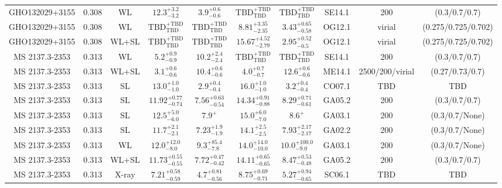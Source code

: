 \begin{table}
\begin{tabular}{cccccccccc}
GHO132029+3155 & 0.308 & WL & ${12.3}^{+3.2}_{-3.2}$ & ${3.9}^{+0.6}_{-0.6}$ & ${\mathrm{TBD}}^{+\mathrm{TBD}}_{\mathrm{TBD}}$ & ${\mathrm{TBD}}^{+\mathrm{TBD}}_{\mathrm{TBD}}$ & SE14.1 & 200 & (0.3/0.7/0.7) \\
GHO132029+3155 & 0.308 & WL & ${\mathrm{TBD}}^{+\mathrm{TBD}}_{\mathrm{TBD}}$ & ${\mathrm{TBD}}^{+\mathrm{TBD}}_{\mathrm{TBD}}$ & ${8.81}^{+3.35}_{-2.35}$ & ${3.43}^{+0.65}_{-0.58}$ & OG12.1 & virial & (0.275/0.725/0.702) \\
GHO132029+3155 & 0.308 & WL+SL & ${\mathrm{TBD}}^{+\mathrm{TBD}}_{\mathrm{TBD}}$ & ${\mathrm{TBD}}^{+\mathrm{TBD}}_{\mathrm{TBD}}$ & ${15.67}^{+4.52}_{-2.79}$ & ${2.95}^{+0.52}_{-0.5}$ & OG12.1 & virial & (0.275/0.725/0.702) \\
MS 2137.3-2353 & 0.313 & WL & ${5.2}^{+0.9}_{-0.9}$ & ${10.2}^{+2.4}_{-2.4}$ & ${\mathrm{TBD}}^{+\mathrm{TBD}}_{\mathrm{TBD}}$ & ${\mathrm{TBD}}^{+\mathrm{TBD}}_{\mathrm{TBD}}$ & SE14.1 & 200 & (0.3/0.7/0.7) \\
MS 2137.3-2353 & 0.313 & WL+SL & ${3.1}^{+0.6}_{-0.6}$ & ${10.4}^{+0.6}_{-0.6}$ & ${4.0}^{+0.7}_{-0.7}$ & ${12.6}^{+0.6}_{-0.6}$ & ME14.1 & 2500/200/virial & (0.27/0.73/0.7) \\
MS 2137.3-2353 & 0.313 & SL & ${13.0}^{+1.0}_{-1.0}$ & ${2.9}^{+0.4}_{-0.4}$ & ${16.0}^{+1.0}_{-1.0}$ & ${3.2}^{+0.4}_{-0.4}$ & CO07.1 & TBD & TBD \\
MS 2137.3-2353 & 0.313 & SL & ${11.92}^{+0.77}_{-0.74}$ & ${7.56}^{+0.63}_{-0.54}$ & ${14.34}^{+0.91}_{-0.88}$ & ${8.29}^{+0.71}_{-0.61}$ & GA05.2 & 200 & (0.3/0.7/0.7) \\
MS 2137.3-2353 & 0.313 & SL & ${12.5}^{+5.0}_{-6.0}$ & ${7.9}^{+}_{}$ & ${15.0}^{+6.0}_{-7.0}$ & ${8.6}^{+}_{}$ & GA03.1 & 200 & (0.3/0.7/None) \\
MS 2137.3-2353 & 0.313 & SL & ${11.7}^{+2.1}_{-2.1}$ & ${7.23}^{+1.9}_{-1.9}$ & ${14.1}^{+2.5}_{-2.5}$ & ${7.93}^{+2.17}_{-2.17}$ & GA02.2 & 200 & (0.3/0.7/None) \\
MS 2137.3-2353 & 0.313 & WL & ${12.0}^{+12.0}_{-8.0}$ & ${9.3}^{+85.4}_{-7.8}$ & ${14.0}^{+14.0}_{-10.0}$ & ${10.0}^{+100.0}_{-9.0}$ & GA03.1 & 200 & (0.3/0.7/None) \\
MS 2137.3-2353 & 0.313 & WL+SL & ${11.73}^{+0.55}_{-0.55}$ & ${7.72}^{+0.47}_{-0.42}$ & ${14.11}^{+0.65}_{-0.65}$ & ${8.47}^{+0.53}_{-0.48}$ & GA05.2 & 200 & (0.3/0.7/0.7) \\
MS 2137.3-2353 & 0.313 & X-ray & ${7.21}^{+0.58}_{-0.59}$ & ${4.7}^{+0.81}_{-0.56}$ & ${8.75}^{+0.69}_{-0.71}$ & ${5.27}^{+0.94}_{-0.65}$ & SC06.1 & TBD & TBD \\

\end{tabular}
\end{table}
